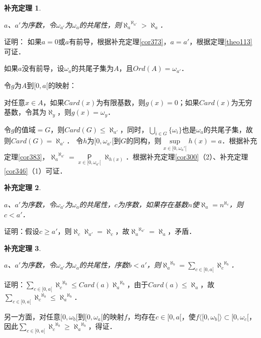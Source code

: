 \documentclass[12pt, a4paper, oneside]{book}
\newtheorem{cor}{补充定理}
\begin{document}
			\begin{cor}\label{cor384}
				\hfill\par
				$a$、$a'$为序数，令$\omega_{a'}$为$\omega_a$的共尾性，则${\aleph_a}^{\aleph_{a'}}>\aleph_a$．
			\end{cor}
			证明：
			如果$a=0$或$a$有前导，根据补充定理\ref{cor373}，$a=a'$，根据定理\ref{theo113}可证．
			\par
			如果$a$没有前导，设$\omega_a$的共尾子集为$A$，且$Ord(A)=\omega_{a'}$．
			\par
			令$g$为$A$到$[0, a[$的映射：
			\par
			对任意$x\in A$，如果$Card(x)$为有限基数，则$g(x)=0$；如果$Card(x)$为无穷基数，令其为$\aleph_y$，则$g(x)=\omega_y$．
			\par
			令$g\text{的值域}=G$，则$Card(G)\leq \aleph_{a'}$，同时，$\bigcup\limits_{i\in G}\{\omega_i\}$也是$\omega_a$的共尾子集，故则$Card(G)=\aleph_{a'}$．
			令$h$为$[0, \omega_{a'}[$到$G$的同构，则$\mathop{sup}\limits_{x\in [0, \omega_a'[}h(x)=a$．根据补充定理\ref{cor383}，${\aleph_a}^{\aleph_{a'}}=\mathop{\mathsf{P}}\limits_{x\in [0, \omega_{a'}[}\aleph_{h(x)}$．根据补充定理\ref{cor300}（2）、补充定理\ref{cor346}（1）可证．
			
			\begin{cor}\label{cor385}
				\hfill\par
				$a$、$a'$为序数，令$\omega_{a'}$为$\omega_a$的共尾性，$c$为序数，如果存在基数$n$使$\aleph_a=n^{\aleph_c}$，则$c<a'$．
			\end{cor}
			证明：假设$c\geq a'$，则$\aleph_c\aleph_{a'}=\aleph_c$，故${\aleph_a}^{\aleph_{a'}}=\aleph_a$，矛盾．
			
			\begin{cor}\label{cor386}
				\hfill\par
				$a$、$a'$为序数，令$\omega_{a'}$为$\omega_a$的共尾性，序数$b<a'$，则${\aleph_a}^{\aleph_b}=\sum\limits_{c\in [0, a[}{\aleph_c}^{\aleph_b}$．
			\end{cor}
			证明：$\sum\limits_{c\in [0, a[}{\aleph_c}^{\aleph_b}\leq Card(a){\aleph_a}^{\aleph_b}$，由于$Card(a)\leq\aleph_a$，故$\sum\limits_{c\in [0, a[}{\aleph_c}^{\aleph_b}\leq {\aleph_a}^{\aleph_b}$．
			\par
			另一方面，对任意$[0, \omega_b[$到$[0, \omega_a[$的映射$f$，均存在$c\in [0, a[$，使$f\langle[0, \omega_b[\rangle\subset [0, \omega_c[$，因此$\sum\limits_{c\in [0, a[}{\aleph_c}^{\aleph_b}\geq {\aleph_a}^{\aleph_b}$，得证．
			
\end{document}
